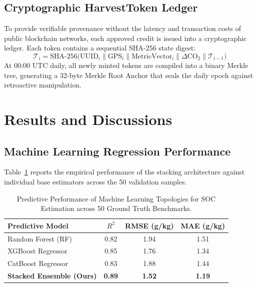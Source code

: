 \documentclass[10pt,a4paper,twocolumn]{IEEEtran}
\begin{document}
\subsection{Cryptographic HarvestToken Ledger}
To provide verifiable provenance without the latency and transaction costs of public blockchain networks, each approved credit is issued into a cryptographic ledger. Each token contains a sequential SHA-256 state digest:
\begin{equation}
  \mathcal{T}_i = \text{SHA-256}\bigl(\text{UUID}_i \mathbin{\|} \text{GPS}_i \mathbin{\|} \text{MetricVector}_i \mathbin{\|} \Delta\text{CO}_2 \mathbin{\|} \mathcal{T}_{i-1}\bigr)
  \label{eq:ledger_hash}
\end{equation}
At 00:00 UTC daily, all newly minted tokens are compiled into a binary Merkle tree, generating a 32-byte Merkle Root Anchor that seals the daily epoch against retroactive manipulation.

\section{Results and Discussions}

\subsection{Machine Learning Regression Performance}
Table~\ref{tab:ml_perf} reports the empirical performance of the stacking architecture against individual base estimators across the 50 validation samples.

\begin{table}[htbp]
  \centering
  \caption{Predictive Performance of Machine Learning Topologies for SOC Estimation across 50 Ground Truth Benchmarks.}
  \label{tab:ml_perf}
  \begin{tabular}{lccc}
    \toprule
    \textbf{Predictive Model} & \textbf{$R^2$} & \textbf{RMSE (g/kg)} & \textbf{MAE (g/kg)} \\
    \midrule
    Random Forest (RF)       & 0.82 & 1.94 & 1.51 \\
    XGBoost Regressor        & 0.85 & 1.76 & 1.34 \\
    CatBoost Regressor       & 0.83 & 1.88 & 1.44 \\
    \midrule
    \textbf{Stacked Ensemble (Ours)} & \textbf{0.89} & \textbf{1.52} & \textbf{1.19} \\
    \bottomrule
  \end{tabular}
\end{table}
\end{document}
